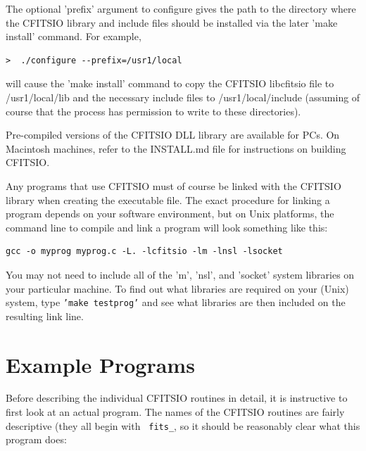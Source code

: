 \documentclass[11pt]{article}
\begin{document}
The optional
'prefix' argument to configure gives the path to the directory where
the CFITSIO library and include files should be installed via the later
'make install' command. For example,

\begin{verbatim}
>  ./configure --prefix=/usr1/local
\end{verbatim}

will cause the 'make install' command to copy the CFITSIO libcfitsio file 
to /usr1/local/lib and the necessary include files to /usr1/local/include
(assuming of course that the  process has permission to write to these 
directories).

Pre-compiled versions of the CFITSIO DLL library are available for
PCs.  On Macintosh machines, refer to the INSTALL.md file for
instructions on building CFITSIO.

Any programs that use CFITSIO must of course be linked with the CFITSIO
library when creating the executable file.  The exact procedure for
linking a program depends on your software environment, but on Unix
platforms, the command line to compile and link a program will look
something like this:

\begin{verbatim}
gcc -o myprog myprog.c -L. -lcfitsio -lm -lnsl -lsocket
\end{verbatim}

You may not need to include all of the 'm', 'nsl', and 'socket' system
libraries on your particular machine.  To find out what libraries are
required on your (Unix) system, type {\tt'make testprog'} and see what
libraries are then included on the resulting link line.

\newpage
\section{Example Programs}

Before describing the individual CFITSIO routines in detail, it is
instructive to first look at an actual program.  The names of the
CFITSIO routines are fairly descriptive (they all begin with {\tt
fits\_}, so it should be reasonably clear what this program does:
\end{document}
